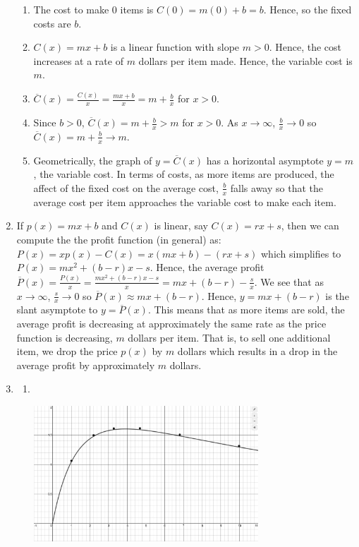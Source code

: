 \begin{enumerate}
\begin{enumerate}
\item  The cost to make $0$ items is $C(0) = m(0)+b = b$.  Hence,  so the fixed costs are $b$.
\item $C(x) = mx+b$ is a linear function with slope $m>0$.  Hence, the cost increases at a rate of $m$ dollars per item made.  Hence, the variable cost is $m$.
\item  $\overline{C}(x) = \frac{C(x)}{x} = \frac{mx+b}{x} = m + \frac{b}{x}$ for $x > 0$.
\item  Since $b>0$,  $\overline{C}(x)  = m + \frac{b}{x} > m$ for $x > 0$. As $x \rightarrow \infty$, $\frac{b}{x} \rightarrow 0$ so $\overline{C}(x)  = m + \frac{b}{x} \rightarrow m$.
\item Geometrically, the graph of $y = \overline{C}(x)$ has a horizontal asymptote $y = m$, the variable cost.  In terms of costs, as more items are produced, the affect of the fixed cost on the average cost, $\frac{b}{x}$ falls away so that the average cost per item approaches the variable cost to make each item.

\end{enumerate}

\item   If $p(x) = mx + b$ and $C(x)$ is linear, say $C(x) = rx+s$, then we can compute the the profit function (in general) as: $P(x) = xp(x) - C(x) = x(mx+b) - (rx+s)$ which simplifies to $P(x) = mx^2 + (b-r)x -s$.  Hence, the average profit $\overline{P}(x) = \frac{P(x)}{x} = \frac{mx^2 + (b-r)x -s}{x} = mx + (b-r) - \frac{s}{x}$.  We see that as $x \rightarrow \infty$, $\frac{s}{x} \rightarrow 0$ so $\overline{P}(x) \approx mx  + (b-r)$.  Hence, $y = mx + (b-r)$ is the slant asymptote  to $y = \overline{P}(x)$.  This means that as more items are sold, the average profit is decreasing at approximately the same rate as the price function is decreasing, $m$ dollars per item.  That is, to sell one additional item, we drop the price $p(x)$ by $m$ dollars which results in a drop in the average profit by approximately $m$ dollars.

\item \begin{enumerate}

\item $~$

\includegraphics[height=2in]{./IntroRationalGraphics/MaxPowerRegression.jpg}


\end{enumerate}
\end{enumerate}
